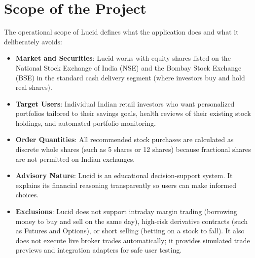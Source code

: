 \section{Scope of the Project}
The operational scope of Lucid defines what the application does and what it deliberately avoids:
\begin{itemize}
    \item \textbf{Market and Securities}: Lucid works with equity shares listed on the National Stock Exchange of India (NSE) and the Bombay Stock Exchange (BSE) in the standard cash delivery segment (where investors buy and hold real shares).
    \item \textbf{Target Users}: Individual Indian retail investors who want personalized portfolios tailored to their savings goals, health reviews of their existing stock holdings, and automated portfolio monitoring.
    \item \textbf{Order Quantities}: All recommended stock purchases are calculated as discrete whole shares (such as 5 shares or 12 shares) because fractional shares are not permitted on Indian exchanges.
    \item \textbf{Advisory Nature}: Lucid is an educational decision-support system. It explains its financial reasoning transparently so users can make informed choices.
    \item \textbf{Exclusions}: Lucid does not support intraday margin trading (borrowing money to buy and sell on the same day), high-risk derivative contracts (such as Futures and Options), or short selling (betting on a stock to fall). It also does not execute live broker trades automatically; it provides simulated trade previews and integration adapters for safe user testing.
\end{itemize}

